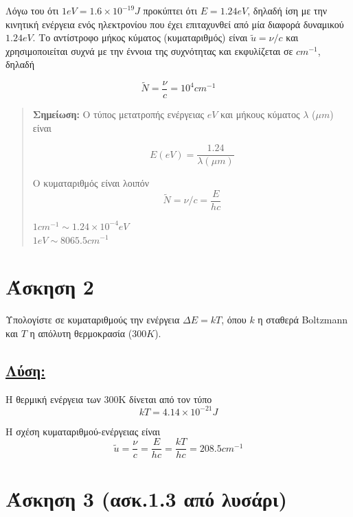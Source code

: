 \documentclass[a4paper,11pt,titlepage]{article}
\begin{document}
Λόγω του ότι $1eV=1.6\times10^{-19}J$ προκύπτει ότι $E=1.24eV$, δηλαδή ίση με την κινητική ενέργεια ενός ηλεκτρονίου που έχει επιταχυνθεί  από μία διαφορά δυναμικού $1.24eV$. Το αντίστροφο μήκος κύματος (κυματαριθμός) είναι $\widetilde{u}=\nu/c$ και χρησιμοποιείται συχνά με την έννοια της συχνότητας και εκφυλίζεται σε $cm^{-1}$, δηλαδή  

\begin{equation}
\widetilde{N}=\frac{\nu}{c}=10^4cm^{-1} 
\end{equation}
\begin{quote}
\textbf{Σημείωση:} Ο τύπος μετατροπής ενέργειας $eV$ και μήκους κύματος $\lambda$ (${\mu}m$) είναι

\begin{equation}
 E(eV)=\frac{1.24}{\lambda({\mu}m)}
\end{equation}

Ο κυματαριθμός είναι λοιπόν
\begin{equation}
 \widetilde{N}=\nu/c=\frac{E}{hc}
\end{equation}

$1cm^{-1}\sim1.24\times10^{-4}eV$\\ $1eV\sim8065.5 cm^{-1}$
\end{quote}
\newpage
\section{Άσκηση 2}

Υπολογίστε σε κυματαριθμούς την ενέργεια ${\Delta}E=kT$, όπου $k$ η σταθερά Boltzmann και $T$ η απόλυτη θερμοκρασία ($300K$).

\subsection*{\underline{Λύση:}}

Η θερμική ενέργεια των 300K δίνεται από τον τύπο
\begin{equation}
 kT=4.14\times10^{-21} J
\end{equation}

Η σχέση κυματαριθμού-ενέργειας είναι
\begin{equation}
 \widetilde{u}=\frac{\nu}{c}=\frac{E}{hc}=\frac{kT}{hc}=208.5 cm^{-1}
\end{equation}

\section{Άσκηση 3 (ασκ.1.3 από λυσάρι)}
\end{document}
